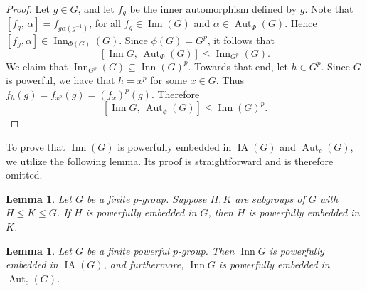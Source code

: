 \documentclass[12pt]{elsarticle}
\newtheorem{lemma}[theorem]{Lemma}
\newtheorem*{main corollary*}{Main Corollary}
\theoremstyle{definition}
\begin{document}
\begin{proof}
Let $g \in G$, and let $f_g$ be the inner automorphism defined by $g$. Note that $[f_g,\, \alpha]= f_{g\alpha(g^{-1})}$, for all $f_g \in \operatorname{Inn}(G)$ and $\alpha \in \operatorname{Aut}_\Phi(G)$.
Hence ${[f_g, \alpha] \in \operatorname{Inn}_{\Phi(G)}(G)}$. 
Since $\phi(G) = G^p$, it follows that
\[
[\operatorname{Inn} G,\, \operatorname{Aut}_\Phi(G)] \leqslant \operatorname{Inn}_{G^p}(G).
\]
We claim that $\operatorname{Inn}_{G^p}(G) 
\subseteq \operatorname{Inn}(G)^p$. Towards that end, let $h \in G^p$. Since $G$ is powerful, we have that $h=x^p$ for some $x\in G$. Thus ${f_h(g)=f_{x^p}(g)=(f_{x})^p(g)}$. Therefore
\[
[\operatorname{Inn} G,\, \operatorname{Aut}_\phi(G)] \leqslant \operatorname{Inn}(G)^p.
\]
\end{proof} 

To prove that $\operatorname{Inn}(G)$ is powerfully embedded in $\operatorname{IA}(G)$ and $\operatorname{Aut}_c(G)$, we utilize the following lemma. Its proof is straightforward and is therefore omitted. 
\begin{lemma}\label{transitivity of PE}
Let $G$ be a finite $p$-group. Suppose $H, K$ are subgroups of $G$ with $H \leqslant K \leqslant G$. If $H$ is powerfully embedded in  $G$, then $H$ is powerfully embedded in $K$.
\end{lemma}

\begin{lemma} \label{Inn G pe}
Let $G$ be a finite powerful $p$-group. Then $\operatorname{Inn} G$ is powerfully embedded in $\operatorname{IA}(G)$, and furthermore, $\operatorname{Inn} G $ is powerfully embedded in $\operatorname{Aut}_c(G)$.
\end{lemma}
\end{document}
